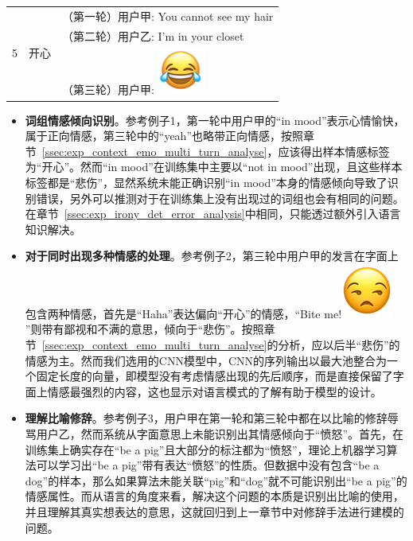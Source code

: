 \begin{table}[]
\begin{minipage}[t]{0.7\linewidth}
\begin{tabularx}{\linewidth}{c|c|l}
  \hline
  \multirow{3}{*}{5} & \multirow{3}{*}{开心} 
    &   （第一轮）用户甲: You cannot see my hair \\
    & & （第二轮）用户乙: I'm in your closet \\
    & & （第三轮）用户甲: \includegraphics[height=1.5\fontcharht\font`\B]{img/emoji/lol.png} \\
  \bottomrule[1.5pt]
  \end{tabularx}
  \end{minipage}
\end{table}


\begin{itemize}

\item {\bf 词组情感倾向识别}。参考例子1，第一轮中用户甲的“in mood”表示心情愉快，属于正向情感，第三轮中的“yeah”也略带正向情感，按照章节~\ref{ssec:exp_context_emo_multi_turn_analyse}，应该得出样本情感标签为“开心”。然而“in mood”在训练集中主要以“not in mood”出现，且这些样本标签都是“悲伤”，显然系统未能正确识别“in mood”本身的情感倾向导致了识别错误，另外可以推测对于在训练集上没有出现过的词组也会有相同的问题。在章节~\ref{ssec:exp_irony_det_error_analysis}中相同，只能透过额外引入语言知识解决。

\item {\bf 对于同时出现多种情感的处理}。参考例子2，第三轮中用户甲的发言在字面上包含两种情感，首先是“Haha”表达偏向“开心”的情感，“Bite me!\includegraphics[height=1.5\fontcharht\font`\B]{img/emoji/speechless.png}”则带有鄙视和不满的意思，倾向于“悲伤”。按照章节~\ref{ssec:exp_context_emo_multi_turn_analyse}的分析，应以后半“悲伤”的情感为主。然而我们选用的CNN模型中，CNN的序列输出以最大池整合为一个固定长度的向量，即模型没有考虑情感出现的先后顺序，而是直接保留了字面上情感最强烈的内容，这也显示对语言模式的了解有助于模型的设计。

\item {\bf 理解比喻修辞}。参考例子3，用户甲在第一轮和第三轮中都在以比喻的修辞辱骂用户乙，然而系统从字面意思上未能识别出其情感倾向于“愤怒”。首先，在训练集上确实存在“be a pig”且大部分的标注都为“愤怒”，理论上机器学习算法可以学习出“be a pig”带有表达“愤怒”的性质。但数据中没有包含“be a dog”的样本，那么如果算法未能关联“pig”和“dog”就不可能识别出“be a pig”的情感属性。而从语言的角度来看，解决这个问题的本质是识别出比喻的使用，并且理解其真实想表达的意思，这就回归到上一章节中对修辞手法进行建模的问题。


\end{itemize}
